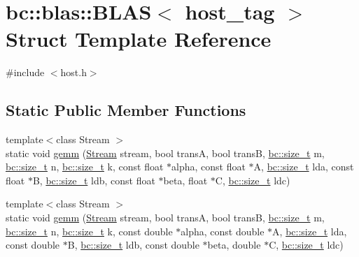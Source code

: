 \hypertarget{structbc_1_1blas_1_1BLAS_3_01host__tag_01_4}{}\section{bc\+:\+:blas\+:\+:B\+L\+AS$<$ host\+\_\+tag $>$ Struct Template Reference}
\label{structbc_1_1blas_1_1BLAS_3_01host__tag_01_4}


{\ttfamily \#include $<$host.\+h$>$}

\subsection*{Static Public Member Functions}
\begin{DoxyCompactItemize}
\item 
{\footnotesize template$<$class Stream $>$ }\\static void \hyperlink{structbc_1_1blas_1_1BLAS_3_01host__tag_01_4_a3a1d3f4f95612d92c0b9887df3afb3f4}{gemm} (\hyperlink{classbc_1_1streams_1_1Stream}{Stream} stream, bool transA, bool transB, \hyperlink{namespacebc_aaf8e3fbf99b04b1b57c4f80c6f55d3c5}{bc\+::size\+\_\+t} m, \hyperlink{namespacebc_aaf8e3fbf99b04b1b57c4f80c6f55d3c5}{bc\+::size\+\_\+t} n, \hyperlink{namespacebc_aaf8e3fbf99b04b1b57c4f80c6f55d3c5}{bc\+::size\+\_\+t} k, const float $\ast$alpha, const float $\ast$A, \hyperlink{namespacebc_aaf8e3fbf99b04b1b57c4f80c6f55d3c5}{bc\+::size\+\_\+t} lda, const float $\ast$B, \hyperlink{namespacebc_aaf8e3fbf99b04b1b57c4f80c6f55d3c5}{bc\+::size\+\_\+t} ldb, const float $\ast$beta, float $\ast$C, \hyperlink{namespacebc_aaf8e3fbf99b04b1b57c4f80c6f55d3c5}{bc\+::size\+\_\+t} ldc)
\item 
{\footnotesize template$<$class Stream $>$ }\\static void \hyperlink{structbc_1_1blas_1_1BLAS_3_01host__tag_01_4_ad7ae94c23655e40a8f32f3c14bc54c86}{gemm} (\hyperlink{classbc_1_1streams_1_1Stream}{Stream} stream, bool transA, bool transB, \hyperlink{namespacebc_aaf8e3fbf99b04b1b57c4f80c6f55d3c5}{bc\+::size\+\_\+t} m, \hyperlink{namespacebc_aaf8e3fbf99b04b1b57c4f80c6f55d3c5}{bc\+::size\+\_\+t} n, \hyperlink{namespacebc_aaf8e3fbf99b04b1b57c4f80c6f55d3c5}{bc\+::size\+\_\+t} k, const double $\ast$alpha, const double $\ast$A, \hyperlink{namespacebc_aaf8e3fbf99b04b1b57c4f80c6f55d3c5}{bc\+::size\+\_\+t} lda, const double $\ast$B, \hyperlink{namespacebc_aaf8e3fbf99b04b1b57c4f80c6f55d3c5}{bc\+::size\+\_\+t} ldb, const double $\ast$beta, double $\ast$C, \hyperlink{namespacebc_aaf8e3fbf99b04b1b57c4f80c6f55d3c5}{bc\+::size\+\_\+t} ldc)

\end{DoxyCompactItemize}
